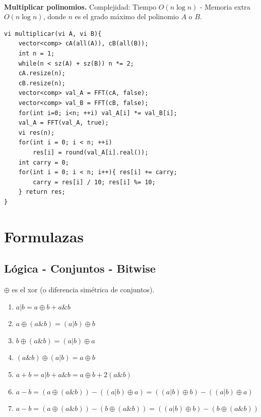 \documentclass[10pt,spanish,mexico]{article}
\numberwithin{equation}{section}
\begin{document}
\begin{multicols}{2}
\vspace{-1.2\baselineskip}
\hrulefill\\
\textbf{Multiplicar polinomios.} Complejidad: Tiempo $O(n\log n)$ - Memoria extra $O(n\log n)$, donde $n$ es el grado máximo del polinomio $A$ o $B$.
\begin{verbatim}
vi multiplicar(vi A, vi B){
    vector<comp> cA(all(A)), cB(all(B));
    int n = 1;
    while(n < sz(A) + sz(B)) n *= 2;
    cA.resize(n);
    cB.resize(n);
    vector<comp> val_A = FFT(cA, false);
    vector<comp> val_B = FFT(cB, false);
    for(int i=0; i<n; ++i) val_A[i] *= val_B[i];
    val_A = FFT(val_A, true);
    vi res(n);
    for(int i = 0; i < n; ++i)
        res[i] = round(val_A[i].real());
    int carry = 0;
    for(int i = 0; i < n; i++){ res[i] += carry;
        carry = res[i] / 10; res[i] %= 10;
    } return res;
}
\end{verbatim}


\vspace{-1.2\baselineskip}
\hrulefill
\section{Formulazas}

\subsection{Lógica - Conjuntos - Bitwise}
$\oplus$ es el xor (o diferencia simétrica de conjuntos).
\begin{enumerate}[1.]
    \item $a|b = a\oplus b + a \& b$
    \item $a\oplus (a\&b) = (a|b)\oplus b$
    \item $b\oplus (a\&b) = (a|b)\oplus a$
    \item $(a\&b)\oplus (a|b) = a\oplus b$
    \item $a + b = a|b + a\&b = a\oplus b + 2(a\&b)$
    \item $a - b = (a\oplus (a\&b))-((a|b)\oplus a) = ((a|b)\oplus b)-((a|b)\oplus a)$
    \item $a - b = (a\oplus (a\&b))-(b\oplus (a\&b)) = ((a|b)\oplus b)-(b\oplus (a\&b))$
\end{enumerate}


\end{multicols}
\end{document}
